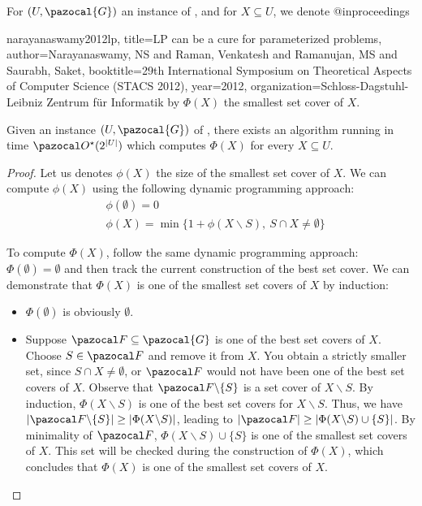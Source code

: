 For $(U, \pazocal{G})$ an instance of , and for $X \subseteq U$, we denote
@inproceedings{narayanaswamy2012lp,
  title={LP can be a cure for parameterized problems},
  author={Narayanaswamy, NS and Raman, Venkatesh and Ramanujan, MS and Saurabh, Saket},
  booktitle={29th International Symposium on Theoretical Aspects of Computer Science (STACS 2012)},
  year={2012},
  organization={Schloss-Dagstuhl-Leibniz Zentrum f{\"u}r Informatik}
 by $\Phi(X)$ the smallest set cover of $X$.

\begin{lemma}
    \label{lemma:set-cover}
    Given an instance $(U, \pazocal{G})$ of , there exists an algorithm running in time $\O^\star(2^{|U|})$ which computes $\Phi(X)$ for every $X \subseteq U$.
\end{lemma}

\begin{proof}
    Let us denotes $\phi(X)$ the size of the smallest set cover of $X$. We can compute $\phi(X)$ using the following dynamic programming approach:
    \begin{align*}
        &\phi(\emptyset) = 0\\
        &\phi(X) = \min\{1 + \phi(X \backslash S),\ S \cap X \neq \emptyset\}
    \end{align*}
    
    To compute $\Phi(X)$, follow the same dynamic programming approach: $\Phi(\emptyset) = \emptyset$ and then track the current construction of the best set cover. We can demonstrate that $\Phi(X)$ is one of the smallest set covers of $X$ by induction:
    \begin{itemize}
        \item $\Phi(\emptyset)$ is obviously $\emptyset$.
        \item Suppose $\F \subseteq \pazocal{G}$ is one of the best set covers of $X$. Choose $S \in \F$ and remove it from $X$. You obtain a strictly smaller set, since $S \cap X \neq \emptyset$, or $\F$ would not have been one of the best set covers of $X$. Observe that $\F \backslash \{S\}$ is a set cover of $X \backslash S$. By induction, $\Phi(X \backslash S)$ is one of the best set covers for $X \backslash S$. Thus, we have $|\F \backslash \{S\}| \geq |\Phi(X \backslash S)|$, leading to $|\F| \geq |\Phi(X \backslash S) \cup \{S\}|$. By minimality of $\F$, $\Phi(X \backslash S) \cup \{S\}$ is one of the smallest set covers of $X$. This set will be checked during the construction of $\Phi(X)$, which concludes that $\Phi(X)$ is one of the smallest set covers of $X$.
    \end{itemize}
    

\end{proof}}
